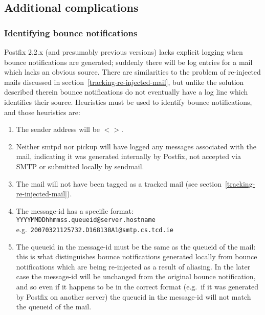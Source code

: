 \documentclass[a4paper,12pt,draft]{article}
\begin{document}
\subsection{Additional complications}

\label{additional complications}

\subsubsection{Identifying bounce notifications}

\label{identifying-bounce-notifications}

Postfix 2.2.x (and presumably previous versions) lacks explicit logging
when bounce notifications are generated; suddenly there will be log entries
for a mail which lacks an obvious source.  There are similarities to the
problem of re-injected mails discussed in
section~\ref{tracking-re-injected-mail}, but unlike the solution described
therein bounce notifications do not eventually have a log line which
identifies their source.  Heuristics must be used to identify bounce
notifications, and those heuristics are:

\begin{enumerate}

    \item The sender address will be $<>$.

    \item Neither smtpd nor pickup will have logged any messages associated
        with the mail, indicating it was generated internally by Postfix,
        not accepted via SMTP or submitted locally by sendmail.

    \item The mail will not have been tagged as a tracked mail (see
        section~\ref{tracking-re-injected-mail}).

    \item The message-id has a specific format: \newline
        \texttt{YYYYMMDDhhmmss.queueid@server.hostname} \newline
        e.g.\ \texttt{20070321125732.D168138A1@smtp.cs.tcd.ie}

    \item The queueid in the message-id must be the same as the queueid of
        the mail: this is what distinguishes bounce notifications generated
        locally from bounce notifications which are being re-injected as a
        result of aliasing.  In the later case the message-id will be
        unchanged from the original bounce notification, and so even if it
        happens to be in the correct format (e.g.\ if it was generated by
        Postfix on another server) the queueid in the message-id will not
        match the queueid of the mail.

\end{enumerate}
\end{document}
